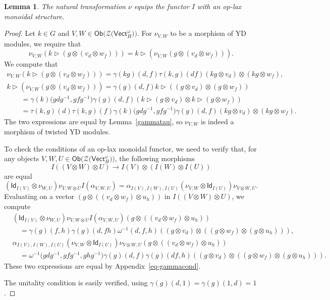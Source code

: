 \documentclass[10pt,a4paper]{amsart}
\numberwithin{equation}{section}
\newtheorem{Lemma}[Theorem]{Lemma}
\newcommand{\ide}{\mathsf{Id}}
\newcommand{\Ob}{\mathsf{Ob}}
\newcommand{\Vect}{\mathsf{Vect}}
\newcommand{\cZ}{\mathcal{Z}}
\newcommand{\rI}{I}
\begin{document}
\begin{Lemma}\label{lem:oplax}
The natural transformation $\nu$ equips the functor $\rI$ with an op-lax monoidal structure.
\end{Lemma}

\begin{proof}
Let $k \in G$ and $V,W \in \Ob \big( \cZ\big(\Vect_H^\omega\big) \big)$. For $\nu_{V,W}$ to be a morphism of YD modules, we require that \[\nu_{V,W}(k\vartriangleright (g \otimes (v_d \otimes w_f))) = k \vartriangleright (\nu_{V,W}(g \otimes (v_d \otimes w_f))).\]
We compute that
\begin{gather*}
 \nu_{V,W}(k\vartriangleright (g \otimes (v_d \otimes w_f))) = \gamma(kg)(d,f)\tau(k,g)(df)(kg \otimes v_d) \otimes (kg \otimes w_f), \\
 k \vartriangleright (\nu_{V,W}(g \otimes (v_d \otimes w_f))) = \gamma(g)(d,f) k \vartriangleright ((g\otimes v_d) \otimes (g \otimes w_f)) \\
\qquad{} =\gamma(k)\big(gdg^{-1},gfg^{-1}\big)\gamma(g)(d,f)
 (k\vartriangleright(g \otimes v_d) \otimes k \vartriangleright (g \otimes w_f)) \\
 \qquad{} =\tau(k,g)(d)\tau(k,g)(f)\gamma(k)\big(gdg^{-1},gfg^{-1}\big) \gamma(g)(d,f)(kg \otimes v_d) \otimes (kg \otimes w_f).
\end{gather*}
The two expressions are equal by Lemma~\ref{gammatau}, so $\nu_{V,W}$ is indeed a morphism of twisted YD modules.

To check the conditions of an op-lax monoidal functor, we need to verify that, for any objects $V,W,U \in \Ob \big( \cZ \big( \Vect_H^\omega \big)\big) $, the following morphisms \[
\rI( ( V \otimes W ) \otimes U) \to \rI(V) \otimes (\rI(W) \otimes \rI(U))\]
 are equal
\begin{equation*}
 (\ide_{\rI(V)}\otimes \nu_{W,U})\nu_{V,W\otimes U}I(\alpha_{V,W,U}) = \alpha_{\rI(V),\rI(W),\rI(U)} (\nu_{V,W} \otimes \ide_{\rI(U)}) \nu_{V\otimes W,U}.
\end{equation*}
Evaluating on a vector $(g \otimes ((v_d \otimes w_f) \otimes u_h))$ in $\rI( ( V \otimes W ) \otimes U)$, we compute
\begin{align*}
 &(\ide_{\rI(V)}\otimes \nu_{W,U})\nu_{V,W\otimes U}I(\alpha_{V,W,U})(g \otimes ((v_d \otimes w_f) \otimes u_h)) \\
 &\quad= \gamma(g)(f,h)\gamma(g)(d,fh) \omega^{-1}(d,f,h)((g\otimes v_d)\otimes ((g\otimes w_f) \otimes (g\otimes u_h))),\\
&\alpha_{\rI(V),\rI(W),\rI(U)} (\nu_{V,W} \otimes \ide_{\rI(U)}) \nu_{V\otimes W,U}(g \otimes ((v_d \otimes w_f) \otimes u_h)) \\
 &\quad= \omega^{-1}\big(gdg^{-1},gfg^{-1},ghg^{-1}\big)\gamma(g)(d,f)\gamma(g)(df,h)
((g\otimes v_d)\otimes ((g\otimes w_f) \otimes (g\otimes u_h))).
\end{align*}
These two expressions are equal by Appendix~\ref{eq-gammacond}.

The unitality condition is easily verified, using $\gamma(g)(d,1)=\gamma(g)(1,d)=1$.
\end{proof}
\end{document}
